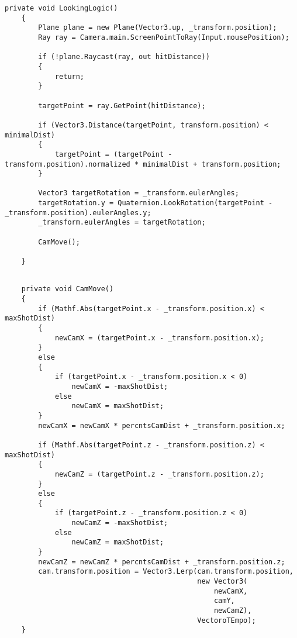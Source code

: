 \documentclass[14pt, titlepage,fleqn,a4paper]{extarticle}
\begin{document}
	 \begin{lstlisting}[caption= Основная функция камеры, label=lst:test]
    private void LookingLogic()
    {
        Plane plane = new Plane(Vector3.up, _transform.position);
        Ray ray = Camera.main.ScreenPointToRay(Input.mousePosition);

        if (!plane.Raycast(ray, out hitDistance))
        {
            return;
        }

        targetPoint = ray.GetPoint(hitDistance);

        if (Vector3.Distance(targetPoint, transform.position) < minimalDist)
        {
            targetPoint = (targetPoint - transform.position).normalized * minimalDist + transform.position;
        }

        Vector3 targetRotation = _transform.eulerAngles;
        targetRotation.y = Quaternion.LookRotation(targetPoint - _transform.position).eulerAngles.y; 
        _transform.eulerAngles = targetRotation;

        CamMove();

    }
    \end{lstlisting}
    \newpage
    \begin{lstlisting}[caption= Функция передвижения камеры, label=lst:test]
    
    private void CamMove()
    {
        if (Mathf.Abs(targetPoint.x - _transform.position.x) < maxShotDist)
        {
            newCamX = (targetPoint.x - _transform.position.x);
        }
        else
        {
            if (targetPoint.x - _transform.position.x < 0)
                newCamX = -maxShotDist;
            else
                newCamX = maxShotDist;
        }
        newCamX = newCamX * percntsCamDist + _transform.position.x;

        if (Mathf.Abs(targetPoint.z - _transform.position.z) < maxShotDist)
        {
            newCamZ = (targetPoint.z - _transform.position.z);
        }
        else
        {
            if (targetPoint.z - _transform.position.z < 0)
                newCamZ = -maxShotDist;
            else
                newCamZ = maxShotDist;
        }
        newCamZ = newCamZ * percntsCamDist + _transform.position.z;
        cam.transform.position = Vector3.Lerp(cam.transform.position,
                                              new Vector3(
                                                  newCamX,
                                                  camY,
                                                  newCamZ),
                                              VectoroTEmpo);
    }
    \end{lstlisting}
\end{document}
